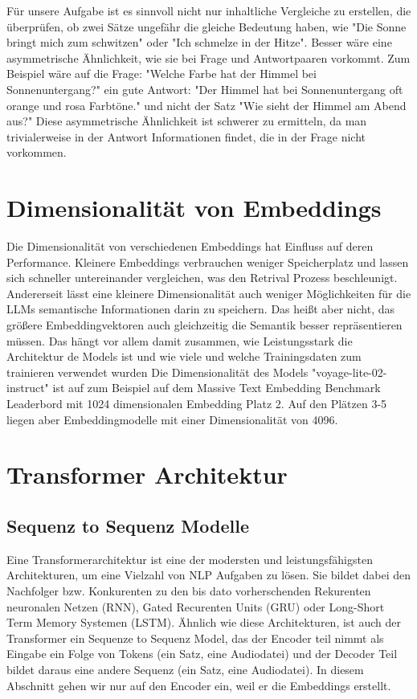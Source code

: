 Für unsere Aufgabe ist es sinnvoll nicht nur inhaltliche Vergleiche zu erstellen, die überprüfen, ob zwei Sätze ungefähr die gleiche Bedeutung haben, wie "Die Sonne bringt mich zum schwitzen" oder "Ich schmelze in der Hitze".
Besser wäre eine asymmetrische Ähnlichkeit, wie sie bei Frage und Antwortpaaren vorkommt.
Zum Beispiel wäre auf die Frage: "Welche Farbe hat der Himmel bei Sonnenuntergang?" ein gute Antwort: "Der Himmel hat bei Sonnenuntergang oft orange und rosa Farbtöne."  und nicht der Satz "Wie sieht der Himmel am Abend aus?"
Diese asymmetrische Ähnlichkeit ist schwerer zu ermitteln, da man trivialerweise in der Antwort Informationen findet, die in der Frage nicht vorkommen.

\section{Dimensionalität von Embeddings}

Die Dimensionalität von verschiedenen Embeddings hat Einfluss auf deren Performance.
Kleinere Embeddings verbrauchen weniger Speicherplatz und lassen sich schneller untereinander vergleichen, was den Retrival Prozess beschleunigt.
Andererseit lässt eine kleinere Dimensionalität auch weniger Möglichkeiten für die LLMs semantische Informationen darin zu speichern.
Das heißt aber nicht, das größere Embeddingvektoren auch gleichzeitig die Semantik besser repräsentieren müssen.
Das hängt vor allem damit zusammen, wie Leistungsstark die Architektur de Models ist und wie viele und welche Trainingsdaten zum trainieren verwendet wurden
Die Dimensionalität des Models "voyage-lite-02-instruct" ist auf zum Beispiel auf dem Massive Text Embedding Benchmark Leaderbord mit 1024 dimensionalen Embedding Platz 2.
Auf den Plätzen 3-5 liegen aber Embeddingmodelle mit einer Dimensionalität von 4096.


\section{Transformer Architektur}

\subsection{Sequenz to Sequenz Modelle}

Eine Transformerarchitektur ist eine der modersten und leistungsfähigsten Architekturen, um eine Vielzahl von  NLP Aufgaben zu lösen. 
Sie bildet dabei den Nachfolger bzw. Konkurenten zu den bis dato vorherschenden Rekurenten neuronalen Netzen (RNN), Gated Recurenten Units (GRU) oder Long-Short Term Memory Systemen (LSTM). 
Ähnlich wie diese Architekturen, ist auch der Transformer ein Sequenze to Sequenz Model, das der Encoder teil nimmt als Eingabe ein Folge von Tokens (ein Satz, eine Audiodatei) und der Decoder Teil bildet daraus eine andere Sequenz (ein Satz, eine Audiodatei). 
In diesem Abschnitt gehen wir nur auf den Encoder ein, weil er die Embeddings erstellt.

